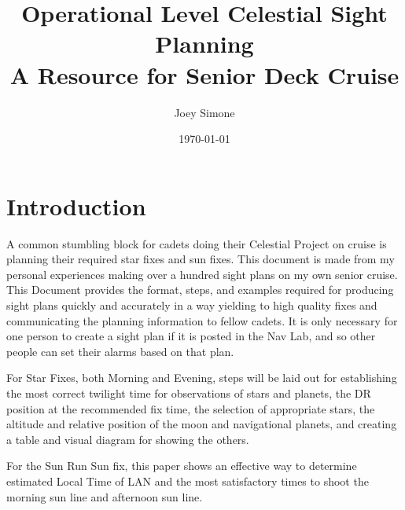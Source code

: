 \documentclass{article}
\title{Operational Level Celestial Sight Planning \\
\large A Resource for Senior Deck Cruise}
\author{Joey Simone}
\date{\today} %
\begin{document}
\maketitle

\section*{Introduction}

A common stumbling block for cadets doing their Celestial Project on cruise is planning their required star fixes and sun fixes. This document is made from my personal experiences making over a hundred sight plans on my own senior cruise. This Document provides the format, steps, and examples required for producing sight plans quickly and accurately in a way yielding to high quality fixes and communicating the planning information to fellow cadets. It is only necessary for one person to create a sight plan if it is posted in the Nav Lab, and so other people can set their alarms based on that plan.

For Star Fixes, both Morning and Evening, steps will be laid out for establishing the most correct twilight time for observations of stars and planets, the DR position at the recommended fix time, the selection of appropriate stars, the altitude and relative position of the moon and navigational planets, and creating a table and visual diagram for showing the others.

For the Sun Run Sun fix, this paper shows an effective way to determine estimated Local Time of LAN and the most satisfactory times to shoot the morning sun line and afternoon sun line.
\end{document}
